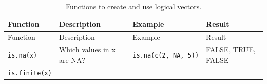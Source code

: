 \documentclass[]{book}
\theoremstyle{definition}
\theoremstyle{definition}
\theoremstyle{remark}
\begin{document}
\begin{longtable}[]{@{}llll@{}}
\caption{\label{tab:logicalfunctions} Functions to create and use logical
vectors.}\tabularnewline
\toprule
\begin{minipage}[b]{0.20\columnwidth}\raggedright\strut
Function\strut
\end{minipage} & \begin{minipage}[b]{0.23\columnwidth}\raggedright\strut
Description\strut
\end{minipage} & \begin{minipage}[b]{0.31\columnwidth}\raggedright\strut
Example\strut
\end{minipage} & \begin{minipage}[b]{0.06\columnwidth}\raggedright\strut
Result\strut
\end{minipage}\tabularnewline
\midrule
\endfirsthead
\toprule
\begin{minipage}[b]{0.20\columnwidth}\raggedright\strut
Function\strut
\end{minipage} & \begin{minipage}[b]{0.23\columnwidth}\raggedright\strut
Description\strut
\end{minipage} & \begin{minipage}[b]{0.31\columnwidth}\raggedright\strut
Example\strut
\end{minipage} & \begin{minipage}[b]{0.06\columnwidth}\raggedright\strut
Result\strut
\end{minipage}\tabularnewline
\midrule
\endhead
\begin{minipage}[t]{0.20\columnwidth}\raggedright\strut
\texttt{is.na(x)}\strut
\end{minipage} & \begin{minipage}[t]{0.23\columnwidth}\raggedright\strut
Which values in x are NA?\strut
\end{minipage} & \begin{minipage}[t]{0.31\columnwidth}\raggedright\strut
\texttt{is.na(c(2,\ NA,\ 5))}\strut
\end{minipage} & \begin{minipage}[t]{0.06\columnwidth}\raggedright\strut
FALSE, TRUE, FALSE\strut
\end{minipage}\tabularnewline
\begin{minipage}[t]{0.20\columnwidth}\raggedright\strut
\texttt{is.finite(x)}\strut
\end{minipage} & \begin{minipage}[t]{0.23\columnwidth}\raggedright\strut

\end{minipage}
\end{longtable}
\end{document}
